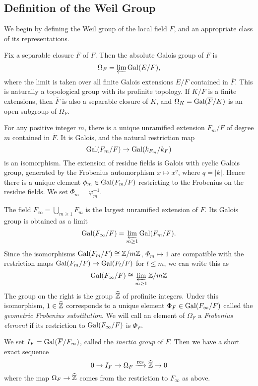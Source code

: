 \subsection{Definition of the Weil Group}
We begin by defining the Weil group of the local field $F$, and an appropriate class of its representations.

Fix a separable closure $\overline{F}$ of $F$. Then the absolute Galois group of $F$ is
\[\Omega_F = \varprojlim\mathrm{Gal}(E/F),\]
where the limit is taken over all finite Galois extensions $E/F$ contained in $\overline{F}$. This is naturally a topological group with its profinite topology. If $K/F$ is a finite extensions, then $\overline{F}$ is also a separable closure of $K$, and $\Omega_K = \mathrm{Gal}(\overline{F}/K)$ is an open subgroup of $\Omega_F$.

For any positive integer $m$, there is a unique unramified extension $F_m/F$ of degree $m$ contained in $\overline{F}$. It is Galois, and the natural restriction map
\[\mathrm{Gal}(F_m/F)\to \mathrm{Gal}(k_{F_m}/k_F)\]
is an isomorphism. The extension of residue fields is Galois with cyclic Galois group, generated by the Frobenius automorphism $x\mapsto x^q$, where $q = |k|$. Hence there is a unique element $\phi_m\in \mathrm{Gal}(F_m/F)$ restricting to the Frobenius on the residue fields. We set $\Phi_m = \varphi_m^{-1}$.

The field $F_\infty = \bigcup_{m\ge1} F_m$ is the largest unramified extension of $F$. Its Galois group is obtained as a limit
\[\mathrm{Gal}(F_\infty/F) = \varprojlim_{m\ge 1}\mathrm{Gal}(F_m/F).\]
Since the isomorphisms $\mathrm{Gal}(F_m/F)\cong \mathbb{Z}/m\mathbb{Z}$, $\Phi_m\mapsto 1$ are compatible with the restriction maps $\mathrm{Gal}(F_m/F)\to\mathrm{Gal}(F_l/F)$ for $l\le m$, we can write this as
\[\mathrm{Gal}(F_\infty/F)\cong \varprojlim_{m\ge 1} \mathbb{Z}/m\mathbb{Z}\]
The group on the right is the group $\widehat{\mathbb{Z}}$ of profinite integers. Under this isomorphism, $1\in \widehat{\mathbb{Z}}$ corresponds to a unique element $\Phi_F\in \mathrm{Gal}(F_\infty/F)$ called the \emph{geometric Frobenius substitution}. We will call an element of $\Omega_F$ a \emph{Frobenius element} if its restriction to $\mathrm{Gal}(F_\infty/F)$ is $\Phi_F$. 

We set $I_F = \mathrm{Gal}(\overline{F}/F_\infty)$, called the \emph{inertia group} of $F$. Then we have a short exact sequence
\[0 \to I_F\to \Omega_F \xrightarrow{\text{res}} \widehat{\mathbb{Z}}\to 0\]
where the map $\Omega_F\to \widehat{\mathbb{Z}}$ comes from the restriction to $F_\infty$ as above.

